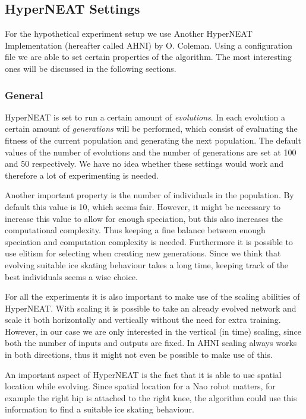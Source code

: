 \documentclass[a4paper,10pt]{article}
\begin{document}
\subsection{HyperNEAT Settings}
For the hypothetical experiment setup we use Another HyperNEAT Implementation (hereafter called AHNI) by O. Coleman. Using a configuration file we are able to set certain properties of the algorithm. The most interesting ones will be discussed in the following sections.

\subsubsection{General}
HyperNEAT is set to run a certain amount of \emph{evolutions}. In each evolution a certain amount of \emph{generations} will be performed, which consist of evaluating the fitness of the current population and generating the next population. The default values of the number of evolutions and the number of generations are set at 100 and 50 respectively. We have no idea whether these settings would work and therefore a lot of experimenting is needed.

Another important property is the number of individuals in the population. By default this value is 10, which seems fair. However, it might be necessary to increase this value to allow for enough speciation, but this also increases the computational complexity. Thus keeping a fine balance between enough speciation and computation complexity is needed. Furthermore it is possible to use elitism for selecting when creating new generations. Since we think that evolving suitable ice skating behaviour takes a long time, keeping track of the best individuals seems a wise choice.

For all the experiments it is also important to make use of the scaling abilities of HyperNEAT. With scaling it is possible to take an already evolved network and scale it both horizontally and vertically without the need for extra training. However, in our case we are only interested in the vertical (in time) scaling, since both the number of inputs and outputs are fixed. In AHNI scaling always works in both directions, thus it might not even be possible to make use of this.

An important aspect of HyperNEAT is the fact that it is able to use spatial location while evolving. Since spatial location for a Nao robot matters, for example the right hip is attached to the right knee, the algorithm could use this information to find a suitable ice skating behaviour.
\end{document}
